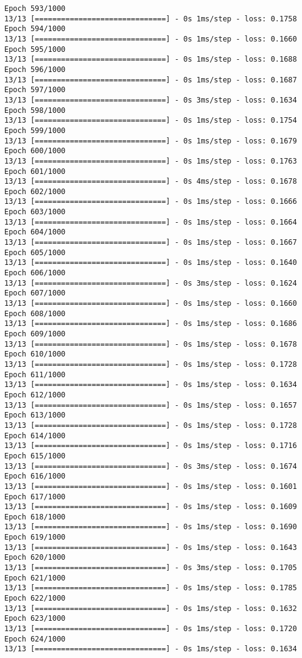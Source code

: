 \documentclass[11pt]{article}
\begin{document}
\begin{Verbatim}[commandchars=\\\{\}]
Epoch 593/1000
13/13 [==============================] - 0s 1ms/step - loss: 0.1758
Epoch 594/1000
13/13 [==============================] - 0s 1ms/step - loss: 0.1660
Epoch 595/1000
13/13 [==============================] - 0s 1ms/step - loss: 0.1688
Epoch 596/1000
13/13 [==============================] - 0s 1ms/step - loss: 0.1687
Epoch 597/1000
13/13 [==============================] - 0s 3ms/step - loss: 0.1634
Epoch 598/1000
13/13 [==============================] - 0s 1ms/step - loss: 0.1754
Epoch 599/1000
13/13 [==============================] - 0s 1ms/step - loss: 0.1679
Epoch 600/1000
13/13 [==============================] - 0s 1ms/step - loss: 0.1763
Epoch 601/1000
13/13 [==============================] - 0s 4ms/step - loss: 0.1678
Epoch 602/1000
13/13 [==============================] - 0s 1ms/step - loss: 0.1666
Epoch 603/1000
13/13 [==============================] - 0s 1ms/step - loss: 0.1664
Epoch 604/1000
13/13 [==============================] - 0s 1ms/step - loss: 0.1667
Epoch 605/1000
13/13 [==============================] - 0s 1ms/step - loss: 0.1640
Epoch 606/1000
13/13 [==============================] - 0s 3ms/step - loss: 0.1624
Epoch 607/1000
13/13 [==============================] - 0s 1ms/step - loss: 0.1660
Epoch 608/1000
13/13 [==============================] - 0s 1ms/step - loss: 0.1686
Epoch 609/1000
13/13 [==============================] - 0s 1ms/step - loss: 0.1678
Epoch 610/1000
13/13 [==============================] - 0s 1ms/step - loss: 0.1728
Epoch 611/1000
13/13 [==============================] - 0s 1ms/step - loss: 0.1634
Epoch 612/1000
13/13 [==============================] - 0s 1ms/step - loss: 0.1657
Epoch 613/1000
13/13 [==============================] - 0s 1ms/step - loss: 0.1728
Epoch 614/1000
13/13 [==============================] - 0s 1ms/step - loss: 0.1716
Epoch 615/1000
13/13 [==============================] - 0s 3ms/step - loss: 0.1674
Epoch 616/1000
13/13 [==============================] - 0s 1ms/step - loss: 0.1601
Epoch 617/1000
13/13 [==============================] - 0s 1ms/step - loss: 0.1609
Epoch 618/1000
13/13 [==============================] - 0s 1ms/step - loss: 0.1690
Epoch 619/1000
13/13 [==============================] - 0s 1ms/step - loss: 0.1643
Epoch 620/1000
13/13 [==============================] - 0s 3ms/step - loss: 0.1705
Epoch 621/1000
13/13 [==============================] - 0s 1ms/step - loss: 0.1785
Epoch 622/1000
13/13 [==============================] - 0s 1ms/step - loss: 0.1632
Epoch 623/1000
13/13 [==============================] - 0s 1ms/step - loss: 0.1720
Epoch 624/1000
13/13 [==============================] - 0s 1ms/step - loss: 0.1634

\end{Verbatim}
\end{document}
